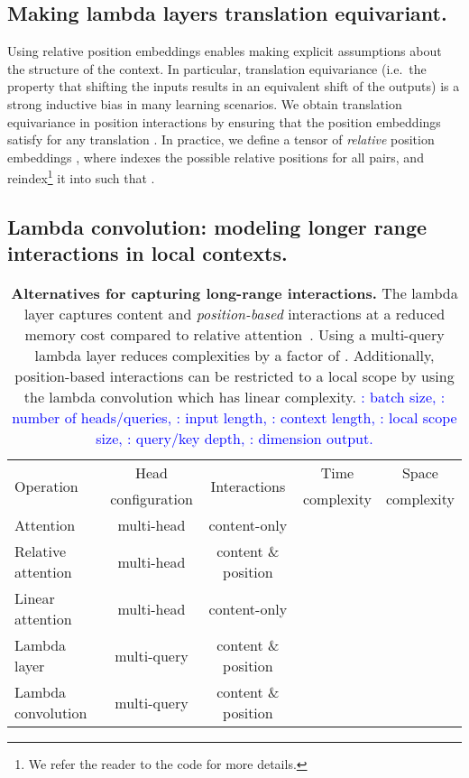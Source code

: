 \documentclass{article} \usepackage{iclr2021_conference,times}
\begin{document}
\vspace{-0.1cm}
\subsection{Making lambda layers translation equivariant.}
Using relative position embeddings  enables making explicit assumptions about the structure of the context.
In particular, translation equivariance (i.e.\ the property that shifting the inputs results in an equivalent shift of the outputs) is a strong inductive bias in many learning scenarios.
We obtain translation equivariance in position interactions by ensuring that the position embeddings satisfy  for any translation .
In practice, we define a tensor of \emph{relative} position embeddings , where  indexes the possible relative positions for all  pairs, and reindex\footnote{We refer the reader to the code for more details.} it into  such that .

\vspace{-0.1cm}
\subsection{Lambda convolution: modeling longer range interactions in local contexts.}
\begin{table}[h]
  \begin{center}
  \small
  \begin{tabular}{l|cccc}
    \toprule
    \multirow{2}{*}{Operation} & Head & \multirow{2}{*}{Interactions} & Time & Space \\
    & configuration & & complexity & complexity \\
    \midrule
    Attention & multi-head & content-only &  &  \\
    Relative attention & multi-head & content \& position &  &  \\
    Linear attention & multi-head & content-only &  &  \\
    \midrule
    Lambda layer & multi-query & content \& position &  &  \\
    Lambda convolution & multi-query & content \& position &  &  \\
    \bottomrule
  \end{tabular}
  \caption{
  \textbf{Alternatives for capturing long-range interactions.}
  The lambda layer captures content and \emph{position-based} interactions at a reduced memory cost compared to relative attention~\citep{shaw2018relative,bello2019aacn}.
  Using a multi-query lambda layer reduces complexities by a factor of .
  Additionally, position-based interactions can be restricted to a local scope by using the lambda convolution which has linear complexity.
  \textcolor{blue}{: batch size, : number of heads/queries, : input length, : context length, : local scope size, : query/key depth, : dimension output.}
  }
  \label{tab:interactions_alternatives}
  \vspace{-0.2cm}
  \end{center}
\end{table}
\end{document}
